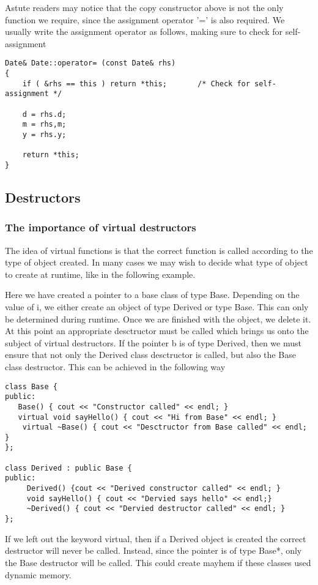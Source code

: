 Astute readers may notice that the copy constructor above is not the only function we require, since the assignment operator '=' is also required. We usually write the assignment operator as follows, making sure to check for self-assignment
\begin{lstlisting}
Date& Date::operator= (const Date& rhs)
{
	if ( &rhs == this ) return *this;		/* Check for self-assignment */
	
	d = rhs.d;
	m = rhs,m;
	y = rhs.y;
	
	return *this;
}
\end{lstlisting}


\subsection{Destructors}

\subsubsection{The importance of virtual destructors}

The idea of virtual functions is that the correct function is called according to the type of object created. In many cases we may wish to decide what type of object to create at runtime, like in the following example.


Here we have created a pointer to a base class of type Base. Depending on the value of i, we either create an object of type Derived or type Base. This can only be determined during runtime. Once we are finished with the object, we delete it. At this point an appropriate desctructor must be called which brings us onto the subject of virtual destructors. If the pointer b is of type Derived, then we must ensure that not only the Derived class desctructor is called, but also the Base class destructor. This can be achieved in the following way
\begin{lstlisting}
class Base {
public:
   Base() { cout << "Constructor called" << endl; }
   virtual void sayHello() { cout << "Hi from Base" << endl; }
    virtual ~Base() { cout << "Desctructor from Base called" << endl; }
};

class Derived : public Base {
public:
     Derived() {cout << "Derived constructor called" << endl; }
     void sayHello() { cout << "Dervied says hello" << endl;}
     ~Derived() { cout << "Dervied destructor called" << endl; }
};
\end{lstlisting}
If we left out the keyword virtual, then if a Derived object is created the correct destructor will never be called. Instead, since the pointer is of type Base*, only the Base destructor will be called. This could create mayhem if these classes used dynamic memory.

